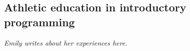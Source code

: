 \subsection{Athletic education in introductory programming}

{\em Emily writes about her experiences here.}